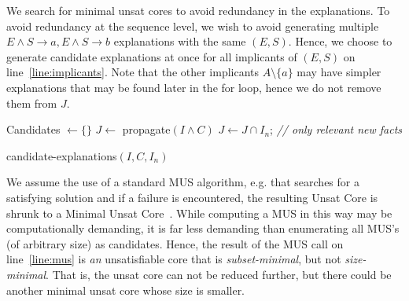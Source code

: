 We search for minimal unsat cores to avoid redundancy in the explanations. To avoid redundancy at the sequence level, we wish to avoid generating multiple $E \wedge S \rightarrow a, E \wedge S \rightarrow b$ explanations with the same $(E, S)$. Hence, we choose to generate candidate explanations at once for all implicants of $(E, S)$ on line~\ref{line:implicants}. Note that the other implicants $A \setminus \{a\}$ may have simpler explanations that may be found later in the for loop, hence we do not remove them from $J$.

 
\begin{algorithm}
% 

% 

  Candidates $\gets \{\}$\;
  $J \gets$ propagate$(I \wedge C)$\;
  $J \gets J \cap I_n$; \textit{\small // only relevant new facts}\\
\caption{candidate-explanations$(I,C,I_n)$}

\label{alg:cand}
\end{algorithm}



We assume the use of a standard MUS algorithm, e.g. that searches for a satisfying solution and if a failure is encountered, the resulting Unsat Core is shrunk to a Minimal Unsat Core~\cite{}. While computing a MUS in this way may be computationally demanding, it is far less demanding than enumerating all MUS's (of arbitrary size) as candidates. 
Hence, the result of the MUS call on line~\ref{line:mus} is \textit{an} unsatisfiable core that is \textit{subset-minimal}, but not \textit{size-minimal}. That is, the unsat core can not be reduced further, but there could be another minimal unsat core whose size is smaller.

